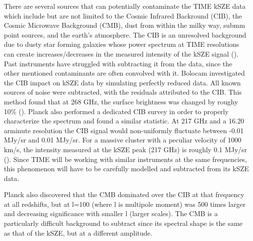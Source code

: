 \documentclass[manuscript]{aastex}
\begin{document}
There are several sources that can potentially contaminate the TIME kSZE data which include but are not limited to the Cosmic Infrared Backround (CIB), the Cosmic Microwave Background (CMB), dust from within the milky way, submm point sources, and the earth's atmosphere. The CIB is an unresolved background due to dusty star forming galaxies whose power spectrum at TIME resolutions can create increases/decreases in the measured intensity of the kSZE signal (\cite{Planck2016b}). Past instruments have struggled with subtracting it from the data, since the other mentioned contaminants are often convolved with it. Bolocam investigated the CIB impact on kSZE data by simulating perfectly reduced data. All known sources of noise were subtracted, with the residuals attributed to the CIB. This method found that at 268 GHz, the surface brightness was changed by roughy 10\% (\cite{Sayers2013}). Planck also performed a dedicated CIB survey in order to properly characterize the spectrum and found a similar statistic.  At 217 GHz and a 16.20 arminute resolution the CIB signal would non-uniformly fluctuate between -0.01 MJy/sr and 0.01 MJy/sr. For a massive cluster with a peculiar velocity of 1000 km/s, the intensity measured at the kSZE peak (217 GHz) is roughly 0.1 MJy/sr (\cite{Planck2014}). Since TIME will be working with similar instruments at the same frequencies, this phenomenon will have to be carefully modelled and subtracted from its kSZE data. 

Planck also discovered that the CMB dominated over the CIB at that frequency at all redshifts, but at l=100 (where l is multipole moment) was 500 times larger and decreasing significance with smaller l (larger scales). The CMB is a particularly difficult background to subtract since its spectral shape is the same as that of the kSZE, but at a different amplitude. 
\end{document}
